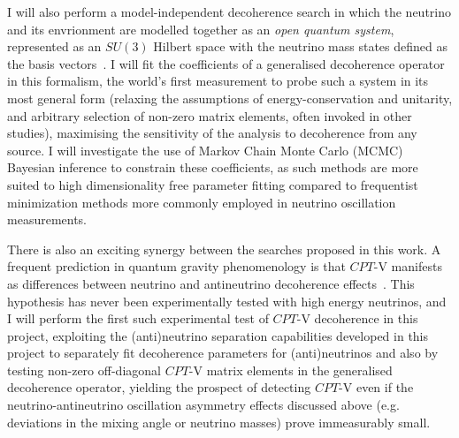 \documentclass[a4paper,11pt]{article}
\begin{document}
I will also perform a model-independent decoherence search in which the neutrino and its envrionment are modelled together as an \textit{open quantum system}, represented as an $SU(3)$ Hilbert space with the neutrino mass states defined as the basis vectors~\cite{lindblad1976, Benatti_2000, gago2002study, PhysRevLett.85.1166}. I will fit the coefficients of a generalised decoherence operator in this formalism, the world's first measurement to probe such a system in its most general form (relaxing the assumptions of energy-conservation and unitarity, and arbitrary selection of non-zero matrix elements, often invoked in other studies), maximising the sensitivity of the analysis to decoherence from any source. I will investigate the use of Markov Chain Monte Carlo (MCMC) Bayesian inference to constrain these coefficients, as such methods are more suited to high dimensionality free parameter fitting compared to frequentist minimization methods more commonly employed in neutrino oscillation measurements.



There is also an exciting synergy between the searches proposed in this work. A frequent prediction in quantum gravity phenomenology is that $CPT$-V manifests as differences between neutrino and antineutrino decoherence effects~\cite{Mavromatos_2009, Barenboim:2004wu, Carrasco:2018sca, Buoninfante:2020iyr, Capolupo:2020myw, Mavromatos:2004gh}. This hypothesis has never been experimentally tested with high energy neutrinos, and I will perform the first such experimental test of $CPT$-V decoherence in this project, exploiting the (anti)neutrino separation capabilities developed in this project to separately fit decoherence parameters for (anti)neutrinos and also by testing non-zero off-diagonal $CPT$-V matrix elements in the generalised decoherence operator, yielding the prospect of detecting $CPT$-V even if the neutrino-antineutrino oscillation asymmetry effects discussed above (e.g. deviations in the mixing angle or neutrino masses) prove immeasurably small.
\end{document}
